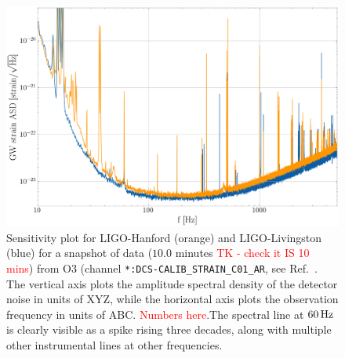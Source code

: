 \documentclass[pra,superscriptaddress,reprint,amsmath,amssymb,nofootinbib]{revtex4-2}
\begin{document}
\begin{figure}
	\begin{center}
		\includegraphics[width=\columnwidth]{images/sensitivity}
	\end{center}
	\caption{Sensitivity plot for LIGO-Hanford (orange) and LIGO-Livingston (blue) for a snapshot of data ($10.0$ minutes \textcolor{red}{TK - check it IS 10 mins}) from O3 (channel \texttt{*:DCS-CALIB\_STRAIN\_C01\_AR}, see Ref.~\cite{LIGO_O3, GWOSC:online}. The vertical axis plots the amplitude spectral density of the detector noise in units of XYZ, while the horizontal axis plots the observation frequency in units of ABC. \textcolor{red}{Numbers here}.The spectral line at $60\,{\rm Hz}$ is clearly visible as a spike rising three decades, along with multiple other instrumental lines at other frequencies.}\label{fig:strainSensitivity}
\end{figure}
\end{document}
